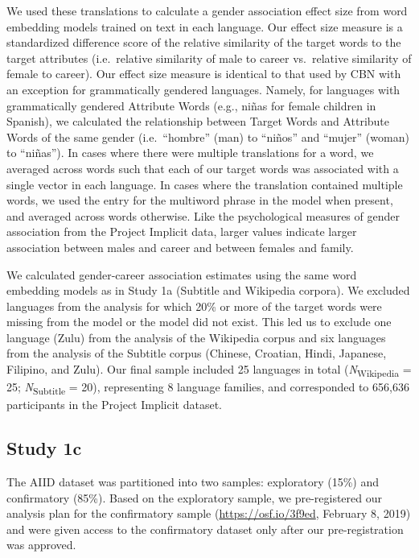 \documentclass[11pt]{wlscirep}
\begin{document}
We used these translations to calculate a gender association effect size from
word embedding models trained on text in each language. Our effect size
measure is a standardized difference score of the relative similarity of
the target words to the target attributes (i.e.~relative similarity of
male to career vs.~relative similarity of female to career). Our effect
size measure is identical to that used by CBN with an exception for
grammatically gendered languages. Namely, for languages with grammatically gendered Attribute
Words (e.g., niñas for female children in Spanish), we calculated the
relationship between Target Words and Attribute Words of the same gender
(i.e.~\enquote{hombre} (man) to \enquote{niños} and \enquote{mujer}
(woman) to \enquote{niñas}). In cases where there were multiple
translations for a word, we averaged across words such that each of our
target words was associated with a single vector in each language. In
cases where the translation contained multiple words, we used the entry
for the multiword phrase in the model when present, and averaged across
words otherwise. Like the psychological measures of gender association from the
Project Implicit data, larger values indicate larger association between males and career and between females and family.

We calculated gender-career association estimates using the same word embedding models
as in Study 1a (Subtitle and Wikipedia corpora). We excluded languages
from the analysis for which 20\% or more of the target words were
missing from the model or the model did not exist. This led us to
exclude one language (Zulu) from the analysis of the Wikipedia corpus
and six languages from the analysis of the Subtitle corpus (Chinese,
Croatian, Hindi, Japanese, Filipino, and Zulu). Our final sample
included 25 languages in total (\emph{N}\textsubscript{Wikipedia} = 25;
\emph{N}\textsubscript{Subtitle} = 20), representing 8 language
families, and corresponded to 656,636  participants in the Project Implicit dataset.


\subsection*{Study 1c}

The AIID dataset was partitioned into two samples: exploratory (15\%) and
confirmatory (85\%). Based on the exploratory sample, we pre-registered
our analysis plan for the confirmatory sample
(\url{https://osf.io/3f9ed}, February 8, 2019) and were given access to the confirmatory dataset only after our pre-registration was approved.
\end{document}
